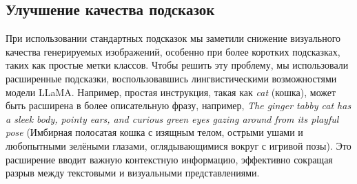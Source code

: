 \documentclass[11pt]{article}
\begin{document}







\subsection{Улучшение качества подсказок}
При использовании стандартных подсказок мы заметили снижение визуального качества генерируемых изображений, особенно при более коротких подсказках, таких как простые метки классов. Чтобы решить эту проблему, мы использовали расширенные подсказки, воспользовавшись лингвистическими возможностями модели LLaMA. Например, простая инструкция, такая как \emph{cat} (кошка), может быть расширена в более описательную фразу, например, \emph{The ginger tabby cat has a sleek body, pointy ears, and curious green eyes gazing around from its playful pose} (Имбирная полосатая кошка с изящным телом, острыми ушами и любопытными зелёными глазами, оглядывающимися вокруг с игривой позы). Это расширение вводит важную контекстную информацию, эффективно сокращая разрыв между текстовыми и визуальными представлениями.
\end{document}
